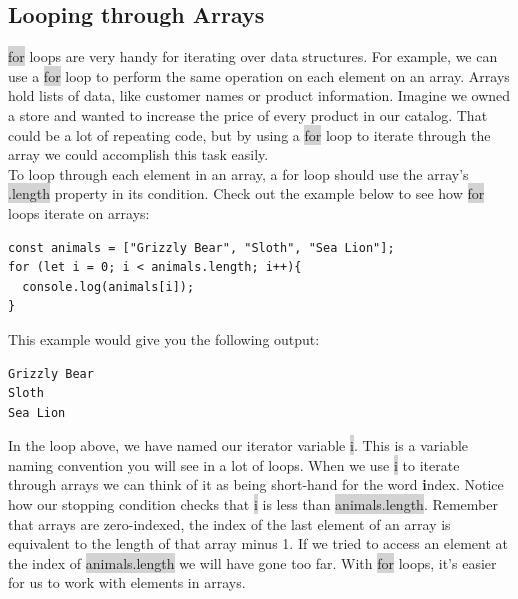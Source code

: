 \documentclass[11pt]{article}
\begin{document}
\subsection{Looping through Arrays}
 \colorbox{lightgray}{for} loops are very handy for iterating over data structures. For example, we can use a  \colorbox{lightgray}{for} loop to perform the same operation on each element on an array. Arrays hold lists of data, like customer names or product information. Imagine we owned a store and wanted to increase the price of every product in our catalog. That could be a lot of repeating code, but by using a \colorbox{lightgray}{for} loop to iterate through the array we could accomplish this task easily. \\
\newline
To loop through each element in an array, a for loop should use the array’s  \colorbox{lightgray}{.length} property in its condition. Check out the example below to see how  \colorbox{lightgray}{for} loops iterate on arrays: 
\begin{lstlisting}
const animals = ["Grizzly Bear", "Sloth", "Sea Lion"];
for (let i = 0; i < animals.length; i++){
  console.log(animals[i]);
}
\end{lstlisting}
This example would give you the following output:
\begin{lstlisting}
Grizzly Bear
Sloth
Sea Lion
\end{lstlisting}
In the loop above, we have named our iterator variable \colorbox{lightgray}{i}. This is a variable naming convention you will see in a lot of loops. When we use \colorbox{lightgray}{i} to iterate through arrays we can think of it as being short-hand for the word \textbf{i}ndex. Notice how our stopping condition checks that \colorbox{lightgray}{i} is less than \colorbox{lightgray}{animals.length}. Remember that arrays are zero-indexed, the index of the last element of an array is equivalent to the length of that array minus 1. If we tried to access an element at the index of \colorbox{lightgray}{animals.length} we will have gone too far. With \colorbox{lightgray}{for} loops, it’s easier for us to work with elements in arrays.
\end{document}
